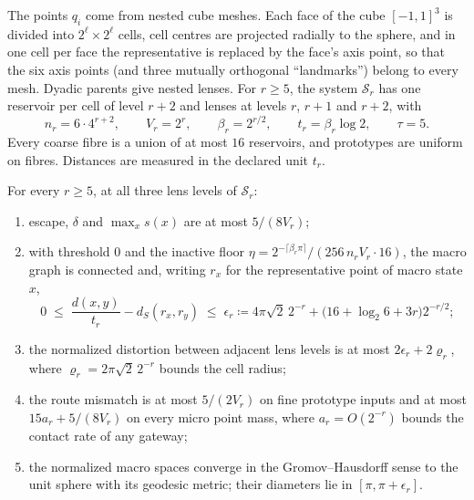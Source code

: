 \documentclass[11pt]{article}
\begin{document}
The points $q_i$ come from nested cube meshes.
Each face of the cube $[-1,1]^3$ is divided into $2^{\ell}\times2^{\ell}$ cells, cell centres are projected radially to the sphere, and in one cell per face the representative is replaced by the face's axis point, so that the six axis points (and three mutually orthogonal ``landmarks'') belong to every mesh.
Dyadic parents give nested lenses.
For $r\ge5$, the system $\mathcal S_r$ has one reservoir per cell of level $r+2$ and lenses at levels $r$, $r+1$ and $r+2$, with
\begin{equation}
n_r=6\cdot4^{r+2},\qquad V_r=2^r,\qquad \beta_r=2^{r/2},\qquad t_r=\beta_r\log2,\qquad\tau=5.
\end{equation}
Every coarse fibre is a union of at most $16$ reservoirs, and prototypes are uniform on fibres.
Distances are measured in the declared unit $t_r$.

\begin{theorem}
\label{thm:sphere}
For every $r\ge5$, at all three lens levels of $\mathcal S_r$:
\begin{enumerate}[label=(\roman*)]
\item escape, $\delta$ and $\max_x s(x)$ are at most $5/(8V_r)$;
\item with threshold $0$ and the inactive floor $\eta=2^{-\lceil\beta_r\pi\rceil}/(256\,n_rV_r\cdot16)$, the macro graph is connected and, writing $r_x$ for the representative point of macro state $x$,
\begin{equation}
0\;\le\;\frac{d(x,y)}{t_r}-d_S(r_x,r_y)\;\le\;\epsilon_r\coloneqq 4\pi\sqrt2\,2^{-r}+\bigl(16+\log_2 6+3r\bigr)2^{-r/2};
\end{equation}
\item the normalized distortion between adjacent lens levels is at most $2\epsilon_r+2\varrho_r$, where $\varrho_r=2\pi\sqrt2\,2^{-r}$ bounds the cell radius;
\item the route mismatch is at most $5/(2V_r)$ on fine prototype inputs and at most $15a_r+5/(8V_r)$ on every micro point mass, where $a_r=O(2^{-r})$ bounds the contact rate of any gateway;
\item the normalized macro spaces converge in the Gromov--Hausdorff sense to the unit sphere with its geodesic metric; their diameters lie in $[\pi,\pi+\epsilon_r]$.
\end{enumerate}
\end{theorem}
\end{document}
